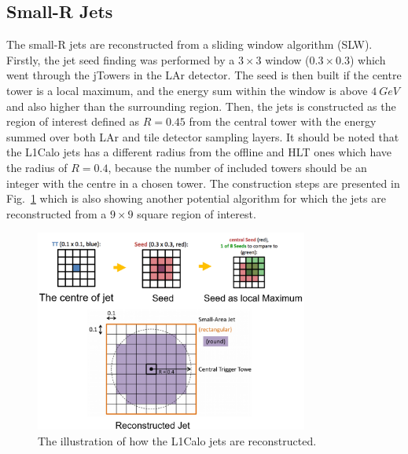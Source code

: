 \subsection{Small-R Jets}
The small-R jets are reconstructed from a sliding window algorithm (SLW). Firstly,  the jet seed finding was performed by a $3\times3$ window ($0.3\times0.3$) which went through the jTowers in the LAr detector. The seed is then built if the centre tower is a local maximum, and the energy sum within the window is above $4~GeV$ and also higher than the surrounding region. Then, the jets is constructed as the region of interest defined as $R=0.45$ from the central tower with the energy summed over both LAr and tile detector sampling layers. It should be noted that the L1Calo jets has a different radius from the offline and HLT ones which have the radius of $R=0.4$, because the number of included towers should be an integer with the centre in a chosen tower. The construction steps are presented in Fig.~\ref{Fig:jet_reco} which is also showing another potential algorithm for which the jets are reconstructed from a $9\times9$ square region of interest. 
\begin{figure}[!h]                
	\includegraphics[width=0.8\textwidth]{Chapter6/jet_reco.png}
	\begin{center}
		\caption{The illustration of how the L1Calo jets are reconstructed.}
		\label{Fig:jet_reco}            
	\end{center}
\end{figure}
\noindent
\\

